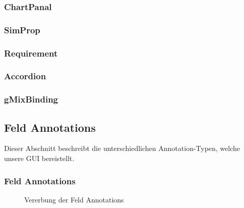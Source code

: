 \documentclass[a4paper, 11pt]{article} %
\begin{document}

\subsubsection{ChartPanal} %
\label{ssub:chartpanal}


\subsubsection{SimProp} %
\label{ssub:simprop}


\subsubsection{Requirement} %
\label{ssub:requirement}


\subsubsection{Accordion} %
\label{ssub:accordion}


\subsubsection{gMixBinding} %
\label{ssub:gmixbinding}



\subsection{Feld Annotations} %
\label{sub:annotations}
Dieser Abschnitt beschreibt die unterschiedlichen Annotation-Typen, welche unsere GUI bereistellt.

\subsubsection{Feld Annotations} %
\label{ssub:feld_annotations}

\begin{figure}[!htp]
\caption{Vererbung der Feld Annotations}
\label{fig:field_annotations}
\end{figure}
\end{document}

